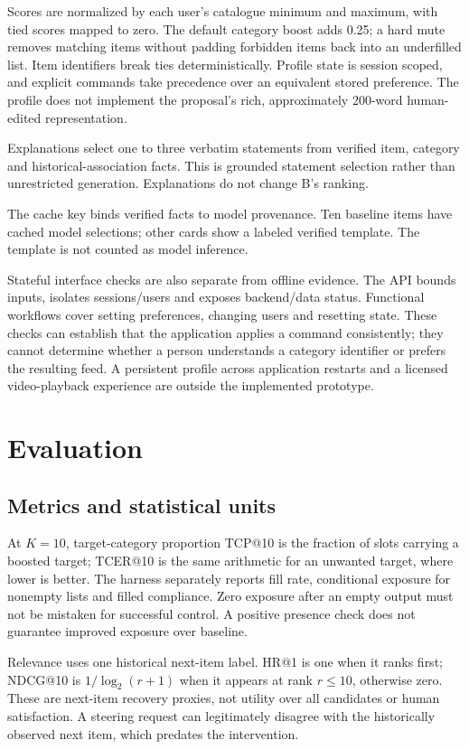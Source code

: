 \documentclass[conference]{IEEEtran}
\begin{document}
Scores are normalized by each user's catalogue minimum and maximum, with tied scores mapped to zero. The default category boost adds 0.25; a hard mute removes matching items without padding forbidden items back into an underfilled list. Item identifiers break ties deterministically. Profile state is session scoped, and explicit commands take precedence over an equivalent stored preference. The profile does not implement the proposal's rich, approximately 200-word human-edited representation.

Explanations select one to three verbatim statements from verified item, category and historical-association facts. This is grounded statement selection rather than unrestricted generation. Explanations do not change B's ranking.

The cache key binds verified facts to model provenance. Ten baseline items have cached model selections; other cards show a labeled verified template. The template is not counted as model inference.

Stateful interface checks are also separate from offline evidence. The API bounds inputs, isolates sessions/users and exposes backend/data status. Functional workflows cover setting preferences, changing users and resetting state. These checks can establish that the application applies a command consistently; they cannot determine whether a person understands a category identifier or prefers the resulting feed. A persistent profile across application restarts and a licensed video-playback experience are outside the implemented prototype.

\section{Evaluation}
\subsection{Metrics and statistical units}
At $K=10$, target-category proportion TCP@10 is the fraction of slots carrying a boosted target; TCER@10 is the same arithmetic for an unwanted target, where lower is better. The harness separately reports fill rate, conditional exposure for nonempty lists and filled compliance. Zero exposure after an empty output must not be mistaken for successful control. A positive presence check does not guarantee improved exposure over baseline.

Relevance uses one historical next-item label. HR@1 is one when it ranks first; NDCG@10 is $1/\log_2(r+1)$ when it appears at rank $r\leq10$, otherwise zero. These are next-item recovery proxies, not utility over all candidates or human satisfaction. A steering request can legitimately disagree with the historically observed next item, which predates the intervention.
\end{document}
